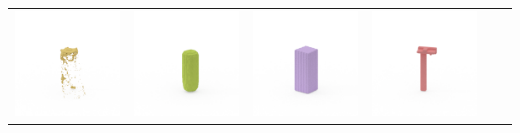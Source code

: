 \documentclass[10pt,onecolumn,letterpaper]{article}
\begin{document}
\begin{tabular}{cccccc}
\includegraphics[height=\turnheight, clip=true, trim=60 30 30 5]{red_bull_NP4_0_visible_pixels_view_270.png} &
\includegraphics[height=\turnheight, clip=true, trim=60 30 30 5]{red_bull_NP4_0_gt_view_270.png} &
\includegraphics[height=\turnheight, clip=true, trim=60 30 30 5]{red_bull_NP4_0_bb_view_270.png} &
\includegraphics[height=\turnheight, clip=true, trim=60 30 30 5]{red_bull_NP4_0_zheng_view_270.png} &

\end{tabular}
\end{document}
